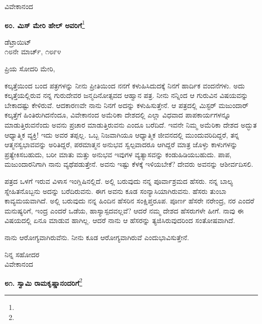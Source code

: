 \vspace{-0.5cm}

{\flushright
ವಿವೇಕಾನಂದ\par}

\begin{center}
\textbf{೮೦. ಮಿಸ್ ಮೇರಿ ಹೇಲ್‌ ಅವರಿಗೆ}\footnote{}
\end{center}

\vspace{-0.5cm}

\begin{flushright}
ಡೆಟ್ರಾಯಿಟ್\\೧೮ನೇ ಮಾರ್ಚ್, ೧೮೯೪
\end{flushright}

\vspace{-0.5cm}

\noindent
ಪ್ರಿಯ ಸೋದರಿ ಮೇರಿ,

ಕಲ್ಕತ್ತೆಯಿಂದ ಬಂದ ಪತ್ರಗಳನ್ನು ನೀನು ಪ್ರೀತಿಯಿಂದ ನನಗೆ ಕಳುಹಿಸಿದುದಕ್ಕೆ ನಿನಗೆ ಹಾರ್ದಿಕ ವಂದನೆಗಳು. ಅದು ಕಲ್ಕತ್ತೆಯಲ್ಲಿರುವ ನನ್ನ ಗುರುದೇವರ ಜನ್ಮದಿನೋತ್ಸವದ ಆಹ್ವಾನ ಪತ್ರ. ನೀನು ನನ್ನಿಂದ ಆ ಗುರುವಿನ ವಿಷಯವನ್ನು ಬೇಕಾದಷ್ಟು ಕೇಳಿರುವೆ. ಆದಕಾರಣವೇ ನಾನು ನಿನಗೆ ಅದನ್ನು ಕಳುಹಿಸುತ್ತೇನೆ. ಆ ಪತ್ರದಲ್ಲಿ ಮಿಸ್ಟರ್ ಮಜುಂದಾರ್ ಕಲ್ಕತ್ತೆಗೆ ಹಿಂತಿರುಗಿದನೆಂದೂ, ವಿವೇಕಾನಂದ ಅಮೆರಿಕಾ ದೇಶದಲ್ಲಿ ಎಲ್ಲಾ ವಿಧವಾದ ಪಾಪಕಾರ್ಯಗಳನ್ನೂ ಮಾಡುತ್ತಿರುವನೆಂದು ಅವನು ಪ್ರಚಾರ ಮಾಡುತ್ತಿರುವನು ಎಂದೂ ಬರೆದಿದೆ. ಇವನೇ ನಿಮ್ಮ ಅಮೆರಿಕಾ ದೇಶದ ಅದ್ಭುತ ಆಧ್ಯಾತ್ಮಿಕ ವ್ಯಕ್ತಿ! ಇದು ಅವರ ತಪ್ಪಲ್ಲ. ಒಬ್ಬ ನಿಜವಾಗಿಯೂ ಆಧ್ಯಾತ್ಮಿಕ ಜೀವನದಲ್ಲಿ ಮುಂದುವರಿದಿದ್ದರೆ, ತನ್ನ ಆತ್ಮನಸ್ವಭಾವವನ್ನು ಅರಿತಿದ್ದರೆ, ಪರಮಾತ್ಮನ ಅನುಭವ ಸ್ವಲ್ಪವಾದರೂ ಆಗಿದ್ದರೆ ಮಾತ್ರ ಜೊಳ್ಳು ಕಾಳುಗಳನ್ನು ಪ್ರತ್ಯೇಕಿಸಬಹುದು, ಬರೀ ಮಾತು ಮತ್ತು ಅನುಭವ ಇವುಗಳ ವ್ಯತ್ಯಾಸವನ್ನು ಕಂಡುಹಿಡಿಯಬಹುದು. ಪಾಪ, ಮಜುಂದಾರನಿಗಾಗಿ ನಾನು ವ್ಯಥೆಪಡುತ್ತೇನೆ. ಅವನು ಇಷ್ಟು ಕೆಳಕ್ಕೆ ಇಳಿಯಬೇಕೆ? ದೇವರು ಅವನನ್ನು ಆಶೀರ್ವದಿಸಲಿ.

ಪತ್ರದ ಒಳಗೆ ಇರುವ ವಿಳಾಸ ಇಂಗ್ಲಿಷಿನಲ್ಲಿದೆ. ಅಲ್ಲಿ ಬರುವುದು ನನ್ನ ಪೂರ್ವಾಶ್ರಮದ ಹೆಸರು. ನನ್ನ ಬಾಲ್ಯ ಸ್ನೇಹಿತನೊಬ್ಬನು ಅದನ್ನು ಬರೆದಿರುವನು. ಈಗ ಅವನು ಕೂಡ ಸಂನ್ಯಾಸಿಯಾಗಿರುವನು. ಹೆಸರು ತುಂಬಾ ಕಾವ್ಯಮಯವಾಗಿದೆ. ಅಲ್ಲಿ ಬರುವುದು ನನ್ನ ಹಿಂದಿನ ಹೆಸರಿನ ಸಂಕ್ಷಿಪ್ತರೂಪ. ಪೂರ್ಣ ಹೆಸರೇ ನರೇಂದ್ರ, ನರ ಎಂದರೆ ಮನುಷ್ಯರಿಗೆ, ಇಂದ್ರ ಎಂದರೆ ಒಡೆಯ, ಹಾಸ್ಯಾಸ್ಪದವಲ್ಲವೆ? ಆದರೆ ನಮ್ಮ ದೇಶದ ಹೆಸರುಗಳೇ ಹೀಗೆ. ನಾವು ಈ ವಿಷಯದಲ್ಲಿ ಏನೂ ಮಾಡುವ ಹಾಗಿಲ್ಲ. ಆದರೆ ನಾನು ಆ ಹೆಸರನ್ನು ತ್ಯಜಿಸಿರುವುದರಿಂದ ಸಂತೋಷವಾಗಿದೆ.

ನಾನು ಆರೋಗ್ಯವಾಗಿರುವೆನು. ನೀನು ಕೂಡ ಆರೋಗ್ಯವಾಗಿರುವೆ ಎಂದು\break ಭಾವಿಸುತ್ತೇನೆ.


{\flushright
ನಿನ್ನ ಸಹೋದರ\\ವಿವೇಕಾನಂದ\par}

\begin{center}
\textbf{೮೧. ಸ್ವಾಮಿ ರಾಮಕೃಷ್ಣಾನಂದರಿಗೆ}\footnote{}
\end{center}

